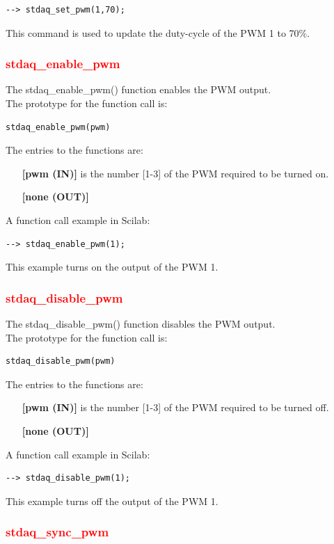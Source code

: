 \documentclass[letterpaper,10pt,english]{hitec}
\begin{document}
\begin{verbatim}
--> stdaq_set_pwm(1,70);
\end{verbatim}
This command is used to update the duty-cycle of the PWM 1 to 70\%.

\subsubsection{\textcolor{red}{stdaq\_enable\_pwm}}

The stdaq\_enable\_pwm() function enables the PWM output. \\
The prototype for the function call is:
\begin{verbatim}
stdaq_enable_pwm(pwm)
\end{verbatim}
The entries to the functions are:
\begin{itemize}
\item [\textbf{[pwm (IN)]}] is the number [1-3] of the PWM required to be turned on. 
\item [\textbf{[none (OUT)]}]
\end{itemize}
A function call example in Scilab:
\begin{verbatim}
--> stdaq_enable_pwm(1);
\end{verbatim}
This example turns on the output of the PWM 1.

\subsubsection{\textcolor{red}{stdaq\_disable\_pwm}}

The stdaq\_disable\_pwm() function disables the PWM output. \\
The prototype for the function call is:
\begin{verbatim}
stdaq_disable_pwm(pwm)
\end{verbatim}
The entries to the functions are:
\begin{itemize}
\item [\textbf{[pwm (IN)]}] is the number [1-3] of the PWM required to be turned off. 
\item [\textbf{[none (OUT)]}]
\end{itemize}
A function call example in Scilab:
\begin{verbatim}
--> stdaq_disable_pwm(1);
\end{verbatim}
This example turns off the output of the PWM 1.

\subsubsection{\textcolor{red}{stdaq\_sync\_pwm}}
\end{document}
